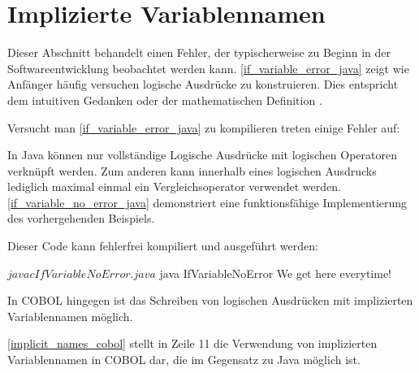 \section{Implizierte Variablennamen}

Dieser Abschnitt behandelt einen Fehler, der typischerweise zu Beginn in der Softwareentwicklung beobachtet werden kann. \autoref{if_variable_error_java} zeigt wie Anfänger häufig versuchen logische Ausdrücke zu konstruieren. Dies entspricht dem intuitiven Gedanken  oder der mathematischen Definition .


Versucht man \autoref{if_variable_error_java} zu kompilieren treten einige Fehler auf:

\begin{shellwindow}
$ javac -Xmaxerrs 3 IfVariableError.java 
IfVariableError.java:4: error: > expected
        if (System.currentTimeMillis() > 0 && < Long.MAX_VALUE) {
                                                              ^
IfVariableError.java:4: error: ')' expected
        if (System.currentTimeMillis() > 0 && < Long.MAX_VALUE) {
                                                               ^
IfVariableError.java:8: error: illegal start of type
        if (0 < System.currentTimeMillis() < Long.MAX_VALUE) {
        ^
3 errors
\end{shellwindow}

In Java können nur vollständige Logische Ausdrücke mit logischen Operatoren verknüpft werden. Zum anderen kann innerhalb eines logischen Ausdrucks lediglich maximal einmal ein Vergleichsoperator verwendet werden. \autoref{if_variable_no_error_java} demonstriert eine funktionsfähige Implementierung des vorhergehenden Beispiels.


Dieser Code kann fehlerfrei kompiliert und ausgeführt werden:

\begin{shellwindow}
$ javac IfVariableNoError.java 
$ java IfVariableNoError
We get here everytime!
\end{shellwindow}

In COBOL hingegen ist das Schreiben von logischen Ausdrücken mit implizierten Variablennamen möglich.


\autoref{implicit_names_cobol} stellt in Zeile 11 die Verwendung von implizierten Variablennamen in COBOL dar, die im Gegensatz zu Java möglich ist.